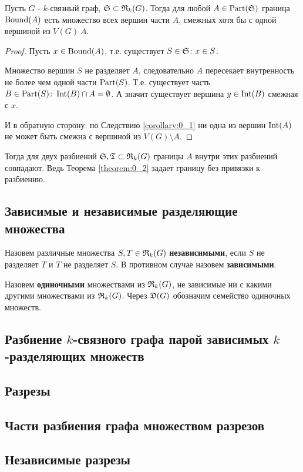 \begin{thm}[Теорема 0.2] \label{theorem:0_2}
	Пусть $G$ - $k$-связный граф, $\S \subset \R_k(G)$.
	Тогда для любой $A \in \Part(\S)$ граница $\Bound(A)$ есть множество всех вершин части  $A$, смежных хотя бы с одной вершиной из $V(G) \ A$. 
\end{thm}
\begin{proof}
	Пусть $x \in \Bound(A)$, т.е. существует $S \in \S \colon x \in S$.

	Множество вершин $S$ не разделяет $A$, следовательно $A$ пересекает внутренность не более чем одной части $\Part(S)$.
	Т.е. существует часть  $B \in \Part(S) \colon \Int(B) \cap A = \emptyset$.
	А значит существует вершина  $y \in \Int(B)$ смежная с  $x$.

	И в обратную сторону: по Следствию \ref{corollary:0_1} ни одна из вершин $\Int(A)$ не может быть смежна с вершиной из  $V(G) \setminus A$.
\end{proof}

\begin{crly}
	Тогда для двух разбиений $\S, \T \subset \R_k(G)$ границы  $A$  внутри этих разбиений совпадают.
	Ведь Теорема \ref{theorem:0_2} задает границу без привязки к разбиению.
\end{crly}

\subsection{Зависимые и независимые разделяющие множества}

\begin{df}
	Назовем различные множества $S, T \in \R_k(G)$ \textbf{независимыми}, если $S$ не разделяет $T$ и $T$ не разделяет $S$.
	В противном случае назовем \textbf{зависимыми}.
\end{df}

\begin{df}
	Назовем \textbf{одиночными} множествами из $\R_k(G)$, не зависимые ни с какими другими множествами из $\R_k(G)$.
	Через $\D(G)$ обозначим семейство одиночных множеств. 
\end{df}

\subsection{Разбиение $k$-связного графа парой зависимых $k$-разделяющих множеств}

\subsection{Разрезы}

\subsection{Части разбиения графа множеством разрезов}

\subsection{Независимые разрезы}

